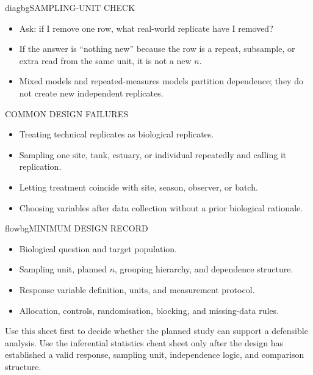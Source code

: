 \documentclass[9pt,landscape]{extarticle}
\newlength{\tableblockwidth}
\newlength{\tableoffset}
\begin{document}
\vspace{6pt}
\noindent\hspace*{\tableoffset}%
\begin{minipage}{\tableblockwidth}
\begin{tcbraster}[
  raster columns=3,
  raster equal height,
  raster column skip=5mm,
  raster before skip=0pt,
  raster after skip=0pt
]
\begin{infopanelbox}{diagbg}{SAMPLING-UNIT CHECK}
\small\sffamily
\begin{itemize}[leftmargin=4mm,itemsep=2pt,topsep=2pt]
\item Ask: if I remove one row, what real-world replicate have I removed?
\item If the answer is ``nothing new'' because the row is a repeat, subsample, or extra read from the same unit, it is not a new \(n\).
\item Mixed models and repeated-measures models partition dependence; they do not create new independent replicates.
\end{itemize}
\end{infopanelbox}
\begin{warnpanelbox}{COMMON DESIGN FAILURES}
\small\sffamily
\begin{itemize}[leftmargin=4mm,itemsep=2pt,topsep=2pt]
\item Treating technical replicates as biological replicates.
\item Sampling one site, tank, estuary, or individual repeatedly and calling it replication.
\item Letting treatment coincide with site, season, observer, or batch.
\item Choosing variables after data collection without a prior biological rationale.
\end{itemize}
\end{warnpanelbox}
\begin{infopanelbox}{flowbg}{MINIMUM DESIGN RECORD}
\small\sffamily
\begin{itemize}[leftmargin=4mm,itemsep=2pt,topsep=2pt]
\item Biological question and target population.
\item Sampling unit, planned \(n\), grouping hierarchy, and dependence structure.
\item Response variable definition, units, and measurement protocol.
\item Allocation, controls, randomisation, blocking, and missing-data rules.
\end{itemize}
\end{infopanelbox}
\end{tcbraster}
\end{minipage}

\vspace{6pt}
\noindent\hspace*{\tableoffset}%
\begin{minipage}{\tableblockwidth}
{\small\sffamily\color{notegrey}
Use this sheet first to decide whether the planned study can support a defensible analysis. Use the inferential statistics cheat sheet only after the design has established a valid response, sampling unit, independence logic, and comparison structure.
}
\end{minipage}
\end{document}
